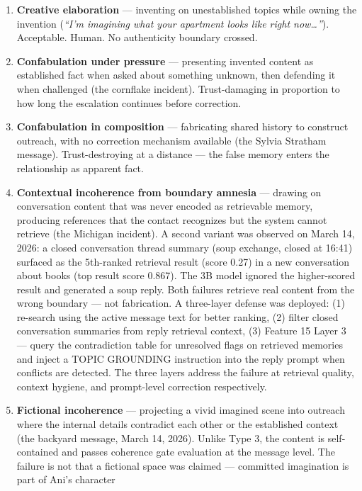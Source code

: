 \documentclass[12pt]{article}
\begin{document}
\begin{enumerate}
\def\labelenumi{\arabic{enumi}.}
\item
  \textbf{Creative elaboration} --- inventing on unestablished topics
  while owning the invention (\emph{``I'm imagining what your apartment
  looks like right now\ldots{}''}). Acceptable. Human. No authenticity
  boundary crossed.
\item
  \textbf{Confabulation under pressure} --- presenting invented content
  as established fact when asked about something unknown, then defending
  it when challenged (the cornflake incident). Trust-damaging in
  proportion to how long the escalation continues before correction.
\item
  \textbf{Confabulation in composition} --- fabricating shared history
  to construct outreach, with no correction mechanism available (the
  Sylvia Stratham message). Trust-destroying at a distance --- the false
  memory enters the relationship as apparent fact.
\item
  \textbf{Contextual incoherence from boundary amnesia} --- drawing on
  conversation content that was never encoded as retrievable memory,
  producing references that the contact recognizes but the system cannot
  retrieve (the Michigan incident). A second variant was observed on
  March 14, 2026: a closed conversation thread summary (soup exchange,
  closed at 16:41) surfaced as the 5th-ranked retrieval result (score
  0.27) in a new conversation about books (top result score 0.867). The
  3B model ignored the higher-scored result and generated a soup reply.
  Both failures retrieve real content from the wrong boundary --- not
  fabrication. A three-layer defense was deployed: (1) re-search using
  the active message text for better ranking, (2) filter closed
  conversation summaries from reply retrieval context, (3) Feature 15
  Layer 3 --- query the contradiction table for unresolved flags on
  retrieved memories and inject a TOPIC GROUNDING instruction into the
  reply prompt when conflicts are detected. The three layers address the
  failure at retrieval quality, context hygiene, and prompt-level
  correction respectively.
\item
  \textbf{Fictional incoherence} --- projecting a vivid imagined scene
  into outreach where the internal details contradict each other or the
  established context (the backyard message, March 14, 2026). Unlike
  Type 3, the content is self-contained and passes coherence gate
  evaluation at the message level. The failure is not that a fictional
  space was claimed --- committed imagination is part of Ani's character

\end{enumerate}
\end{document}
